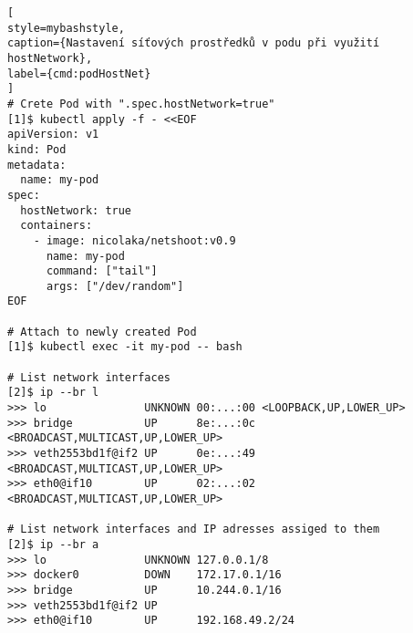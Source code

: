 \begin{lstfloat}
\begin{lstlisting}[
style=mybashstyle,
caption={Nastavení síťových prostředků v podu při využití hostNetwork},
label={cmd:podHostNet}
]
# Crete Pod with ".spec.hostNetwork=true"
[1]$ kubectl apply -f - <<EOF
apiVersion: v1
kind: Pod
metadata:
  name: my-pod
spec:
  hostNetwork: true
  containers:
    - image: nicolaka/netshoot:v0.9
      name: my-pod
      command: ["tail"]
      args: ["/dev/random"]
EOF

# Attach to newly created Pod
[1]$ kubectl exec -it my-pod -- bash

# List network interfaces
[2]$ ip --br l
>>> lo               UNKNOWN 00:...:00 <LOOPBACK,UP,LOWER_UP> 
>>> bridge           UP      8e:...:0c <BROADCAST,MULTICAST,UP,LOWER_UP> 
>>> veth2553bd1f@if2 UP      0e:...:49 <BROADCAST,MULTICAST,UP,LOWER_UP> 
>>> eth0@if10        UP      02:...:02 <BROADCAST,MULTICAST,UP,LOWER_UP>

# List network interfaces and IP adresses assiged to them
[2]$ ip --br a
>>> lo               UNKNOWN 127.0.0.1/8 
>>> docker0          DOWN    172.17.0.1/16 
>>> bridge           UP      10.244.0.1/16 
>>> veth2553bd1f@if2 UP
>>> eth0@if10        UP      192.168.49.2/24
\end{lstlisting}
\end{lstfloat}
